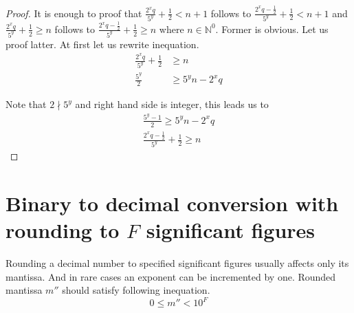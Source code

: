 \documentclass[english]{article}
\renewcommand{\leq}{\leqslant}
\renewcommand{\geq}{\geqslant}
\begin{document}
\begin{proof}
    It is enough to proof that $\frac{2^x q}{5^y} + \frac{1}{2} < n+1$
    follows to $\frac{2^x q - \frac{1}{2}}{5^y} + \frac{1}{2} < n+1$
    and $\frac{2^x q}{5^y} + \frac{1}{2} \geq n$
    follows to $\frac{2^x q - \frac{1}{2}}{5^y} + \frac{1}{2} \geq n$
    where $n \in \mathbb{N}^0$.
    Former is obvious. Let us proof latter. At first let us rewrite inequation.
    \begin{align*}
        \frac{2^x q}{5^y} + \frac{1}{2} & \geq n \\
        \frac{5^y}{2} & \geq 5^y n - 2^x q
    \end{align*}

    Note that $2 \nmid 5^{y}$ and right hand side is integer, this leads us to
    \begin{align*}
        \frac{5^y - 1}{2} \geq 5^y n - 2^x q \\
        \frac{2^x q - \frac{1}{2}}{5^y} + \frac{1}{2} \geq n
    \end{align*}
\end{proof}

\section{Binary to decimal conversion with rounding to $F$ significant figures}

Rounding a decimal number to specified significant figures usually affects only its mantissa.
And in rare cases an exponent can be incremented by one.
Rounded mantissa $m''$ should satisfy following inequation.
\[
    0 \leq m'' < 10^F
\]
\end{document}

